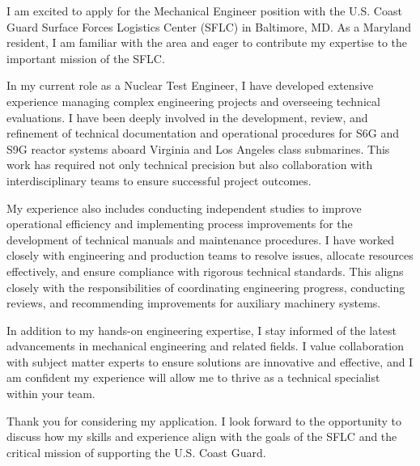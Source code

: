 I am excited to apply for the Mechanical Engineer position with the U.S. Coast Guard Surface Forces Logistics Center (SFLC) in Baltimore, MD.
As a Maryland resident, I am familiar with the area and eager to contribute my expertise to the important mission of the SFLC.

In my current role as a Nuclear Test Engineer, I have developed extensive experience managing complex engineering projects and overseeing technical evaluations.
I have been deeply involved in the development, review, and refinement of technical documentation and operational procedures for S6G and S9G reactor systems aboard Virginia and Los Angeles class submarines.
This work has required not only technical precision but also collaboration with interdisciplinary teams to ensure successful project outcomes.

My experience also includes conducting independent studies to improve operational efficiency and implementing process improvements for the development of technical manuals and maintenance procedures.
I have worked closely with engineering and production teams to resolve issues, allocate resources effectively, and ensure compliance with rigorous technical standards.
This aligns closely with the responsibilities of coordinating engineering progress, conducting reviews, and recommending improvements for auxiliary machinery systems.

In addition to my hands-on engineering expertise, I stay informed of the latest advancements in mechanical engineering and related fields.
I value collaboration with subject matter experts to ensure solutions are innovative and effective, and I am confident my experience will allow me to thrive as a technical specialist within your team.

Thank you for considering my application.
I look forward to the opportunity to discuss how my skills and experience align with the goals of the SFLC and the critical mission of supporting the U.S. Coast Guard.


